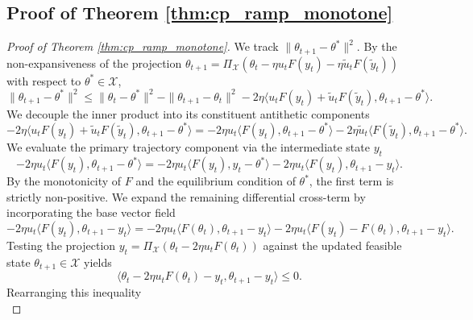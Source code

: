 \documentclass[letter,11pt]{article}
\begin{document}
\subsection{Proof of Theorem \ref{thm:cp_ramp_monotone}}\label{sec:cp_ramp_monotone}
\begin{proof}[Proof of Theorem \ref{thm:cp_ramp_monotone}]
We track $\|\theta_{t+1} - \theta^*\|^2$. By the non-expansiveness of the projection $\theta_{t+1} = \Pi_{\mathcal{X}}(\theta_t - \eta u_t F(y_t) - \eta \tilde{u}_t F(\tilde{y}_t))$ with respect to $\theta^* \in \mathcal{X}$,
\begin{equation} \label{eq:cp_ramp_distance_expansion}
\|\theta_{t+1} - \theta^*\|^2 \le \|\theta_t - \theta^*\|^2 - \|\theta_{t+1} - \theta_t\|^2 - 2\eta \langle u_t F(y_t) + \tilde{u}_t F(\tilde{y}_t), \theta_{t+1} - \theta^* \rangle.
\end{equation}
We decouple the inner product into its constituent antithetic components
\begin{equation}
-2\eta \langle u_t F(y_t) + \tilde{u}_t F(\tilde{y}_t), \theta_{t+1} - \theta^* \rangle = -2\eta u_t \langle F(y_t), \theta_{t+1} - \theta^* \rangle - 2\eta \tilde{u}_t \langle F(\tilde{y}_t), \theta_{t+1} - \theta^* \rangle.
\end{equation}
We evaluate the primary trajectory component via the intermediate state $y_t$
\begin{equation} \label{eq:cp_ramp_t1_split}
-2\eta u_t \langle F(y_t), \theta_{t+1} - \theta^* \rangle = -2\eta u_t \langle F(y_t), y_t - \theta^* \rangle - 2\eta u_t \langle F(y_t), \theta_{t+1} - y_t \rangle.
\end{equation}
By the monotonicity of $F$ and the equilibrium condition of $\theta^*$, the first term is strictly non-positive. We expand the remaining differential cross-term by incorporating the base vector field
\begin{equation}
-2\eta u_t \langle F(y_t), \theta_{t+1} - y_t \rangle = -2\eta u_t \langle F(\theta_t), \theta_{t+1} - y_t \rangle - 2\eta u_t \langle F(y_t) - F(\theta_t), \theta_{t+1} - y_t \rangle.
\end{equation}
Testing the projection $y_t = \Pi_{\mathcal{X}}(\theta_t - 2\eta u_t F(\theta_t))$ against the updated feasible state $\theta_{t+1} \in \mathcal{X}$ yields
\begin{equation}
\langle \theta_t - 2\eta u_t F(\theta_t) - y_t, \theta_{t+1} - y_t \rangle \le 0.
\end{equation}
Rearranging this inequality
\begin{equation}

\end{equation}
\end{proof}
\end{document}
